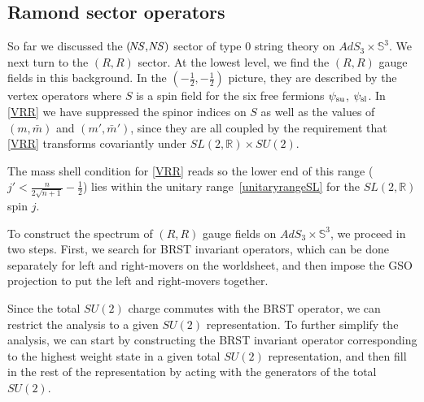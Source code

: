\documentclass[12pt]{article}
\def\sltwo{\ensuremath{SL(2,\bR)}}
\def\NS{{\it \!NS}}
\def\half{\frac12}
\newcommand{\bR}{{\mathbb R}}
\newcommand{\bS}{{\mathbb S}}
\numberwithin{equation}{section}
\def\half{\frac12}
\begin{document}

\subsection{Ramond sector operators}
\label{sec:Ramond}



So far we discussed the $(\NS,\NS)$ sector of type 0 string theory on $AdS_3\times \bS^3$. We next turn to the $(\!R,\!R)$ sector. 
At the lowest level, we find the $(\!R,\!R)$ gauge fields in this background. In the $\left(-\half,-\half\right)$ picture, they are described by the vertex operators
\eqn[VRR]{e^{-\half\varphi-\half\bar\varphi} \,
S \,v^{~}_{j'}
\Phi_{j}^{(0)}~, }
where $S$ is a spin field for the six free fermions $\psi_{\rm su}$, $\psi_{\rm sl}$. In \eqref{VRR} we have suppressed the spinor indices on $S$ as well as the values of $(m,\bar m)$ and $(m',\bar m')$, since they are all coupled by the requirement that \eqref{VRR} transforms covariantly under $\sltwo\times SU(2)$. 

The mass shell condition for \eqref{VRR} reads
\eqn[LzeroRR]{
j-\half = \frac{1}{\sqrt{n+1}}\Big(j'+\half\Big)  ~,
}
so the lower end of this range 
($j'<\frac{n}{2\sqrt{n+1}}-\half$)
lies within the unitary range~\eqref{unitaryrangeSL} for the $\sltwo$ spin $j$.

To construct the spectrum of $(R,R)$ gauge fields on $AdS_3\times \bS^3$, we proceed in two steps. First, we search for BRST invariant operators, which can be done separately for left and right-movers on the worldsheet, and then impose the GSO projection to put the left and right-movers together. 

Since the total $SU(2)$ charge commutes with the BRST operator, we can restrict the analysis to a given $SU(2)$ representation. To further simplify the analysis, we can start by constructing the BRST invariant operator corresponding to the highest weight state in a given total $SU(2)$ representation, and then fill in the rest of the representation by acting with the generators of the total $SU(2)$.  
\end{document}
